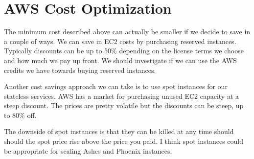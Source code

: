 \documentclass[11pt]{article}
\begin{document}
\section{AWS Cost Optimization}

The minimum cost described above can actually be smaller if we decide to save in a couple of ways. 
We can save in EC2 costs by purchasing reserved instances. Typically discounts can be
up to 50\% depending on the license terms we choose and how much we pay
up front. We should investigate if we can use the AWS credits we have towards
buying reserved instances.

Another cost savings approach we can take is to use spot instances for our stateless
services. AWS has a market for purchasing unused EC2 capacity at a steep discount.
The prices are pretty volatile but the discounts can be steep, up to 80\% off.

The downside of spot instances is that they can be killed at any time should should
the spot price rise above the price you paid. I think spot instances could be 
appropriate for scaling Ashes and Phoenix instances.
\end{document}
